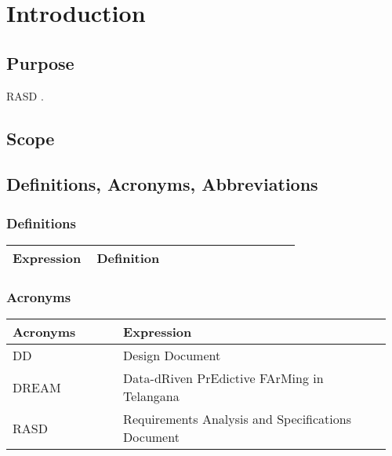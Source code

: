 \chapter{Introduction}

\section{Purpose}

RASD \cite{rasd}.

\section{Scope}

\section{Definitions, Acronyms, Abbreviations}

\subsection{Definitions}

\begin{center}
    \begin{longtable}{@{}p{0.28\linewidth} p{0.68\linewidth}@{}}
		\toprule
		\textbf{Expression}     & \textbf{Definition}\\
		\midrule

	\end{longtable}
\end{center}

\subsection{Acronyms}

\begin{center}
	\begin{longtable}{@{}p{0.28\linewidth} p{0.68\linewidth}@{}}
		\toprule
		\textbf{Acronyms}   & \textbf{Expression}\\
		\endfirsthead
		\midrule
		DD                  & Design Document\\
		DREAM               & Data-dRiven PrEdictive FArMing in Telangana\\
		RASD                & Requirements Analysis and Specifications Document\\
		\bottomrule
	\end{longtable}
\end{center}

